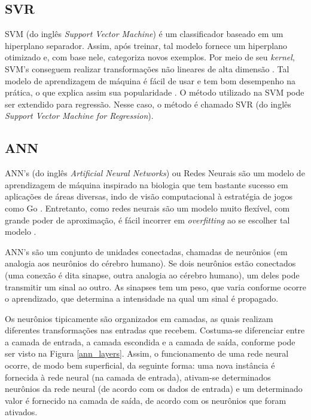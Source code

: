 \subsection{SVR}
SVM (do inglês \textit{Support Vector Machine}) é um classificador baseado em um hiperplano
separador. Assim, após treinar, tal modelo fornece um hiperplano otimizado e, com
base nele,
categoriza novos exemplos. Por meio de seu \textit{kernel}, SVM's conseguem realizar
transformações não lineares de alta dimensão \cite{ml_second_book}. Tal modelo de
aprendizagem de máquina é fácil de usar e tem bom desempenho na prática, o que
explica assim sua popularidade \cite{ml_second_book}. O método utilizado na SVM pode ser
extendido para regressão. Nesse caso, o método é chamado SVR (do inglês
\textit{Support Vector Machine for Regression}). 

\subsection{ANN}
ANN's (do inglês \textit{Artificial Neural Networks}) ou Redes Neurais são um modelo
de aprendizagem de máquina inspirado na biologia que tem bastante sucesso em
aplicações de áreas diversas, indo de visão computacional
\cite{ml_second_book} à estratégia de jogos como Go \cite{google_ann}. Entretanto, como
redes neurais são um modelo muito flexível, com grande poder de aproximação, é fácil
incorrer em \textit{overfitting} ao se escolher tal modelo \cite{ml_second_book}. 
\par ANN's são um conjunto de unidades conectadas, chamadas de neurônios (em
analogia aos neurônios do cérebro humano). Se dois neurônios estão conectados (uma
conexão é dita sinapse, outra analogia ao cérebro humano), um
deles pode transmitir um sinal ao outro. As sinapses tem um peso, que varia conforme
ocorre o aprendizado, que determina a intensidade na qual um sinal é propagado. 
\par Os neurônios tipicamente são organizados em camadas, as quais realizam
diferentes transformações nas entradas que recebem. Costuma-se diferenciar entre a
camada de entrada, a camada escondida e a camada de saída, conforme pode ser visto na
Figura \ref{ann_layers}. Assim, o funcionamento de uma rede neural ocorre, de modo bem
superficial, da seguinte forma: uma nova instância é fornecida à rede
neural (na camada de entrada), ativam-se determinados neurônios da rede neural (de
acordo com os dados de entrada) e um determinado valor é fornecido na camada de
saída, de acordo com os neurônios que foram ativados.  

